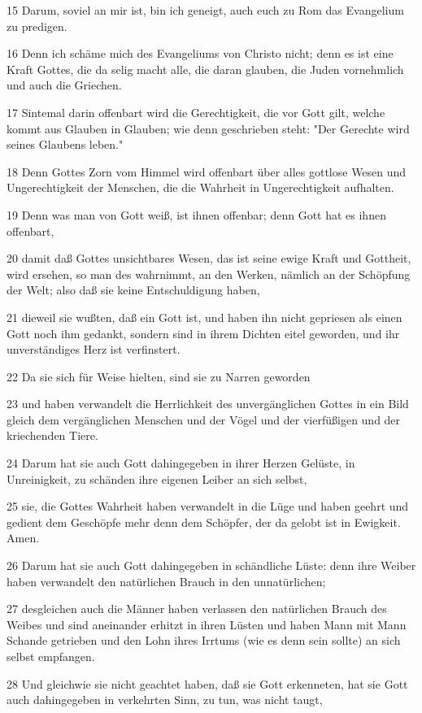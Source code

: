 \par 15 Darum, soviel an mir ist, bin ich geneigt, auch euch zu Rom das Evangelium zu predigen.
\par 16 Denn ich schäme mich des Evangeliums von Christo nicht; denn es ist eine Kraft Gottes, die da selig macht alle, die daran glauben, die Juden vornehmlich und auch die Griechen.
\par 17 Sintemal darin offenbart wird die Gerechtigkeit, die vor Gott gilt, welche kommt aus Glauben in Glauben; wie denn geschrieben steht: "Der Gerechte wird seines Glaubens leben."
\par 18 Denn Gottes Zorn vom Himmel wird offenbart über alles gottlose Wesen und Ungerechtigkeit der Menschen, die die Wahrheit in Ungerechtigkeit aufhalten.
\par 19 Denn was man von Gott weiß, ist ihnen offenbar; denn Gott hat es ihnen offenbart,
\par 20 damit daß Gottes unsichtbares Wesen, das ist seine ewige Kraft und Gottheit, wird ersehen, so man des wahrnimmt, an den Werken, nämlich an der Schöpfung der Welt; also daß sie keine Entschuldigung haben,
\par 21 dieweil sie wußten, daß ein Gott ist, und haben ihn nicht gepriesen als einen Gott noch ihm gedankt, sondern sind in ihrem Dichten eitel geworden, und ihr unverständiges Herz ist verfinstert.
\par 22 Da sie sich für Weise hielten, sind sie zu Narren geworden
\par 23 und haben verwandelt die Herrlichkeit des unvergänglichen Gottes in ein Bild gleich dem vergänglichen Menschen und der Vögel und der vierfüßigen und der kriechenden Tiere.
\par 24 Darum hat sie auch Gott dahingegeben in ihrer Herzen Gelüste, in Unreinigkeit, zu schänden ihre eigenen Leiber an sich selbst,
\par 25 sie, die Gottes Wahrheit haben verwandelt in die Lüge und haben geehrt und gedient dem Geschöpfe mehr denn dem Schöpfer, der da gelobt ist in Ewigkeit. Amen.
\par 26 Darum hat sie auch Gott dahingegeben in schändliche Lüste: denn ihre Weiber haben verwandelt den natürlichen Brauch in den unnatürlichen;
\par 27 desgleichen auch die Männer haben verlassen den natürlichen Brauch des Weibes und sind aneinander erhitzt in ihren Lüsten und haben Mann mit Mann Schande getrieben und den Lohn ihres Irrtums (wie es denn sein sollte) an sich selbst empfangen.
\par 28 Und gleichwie sie nicht geachtet haben, daß sie Gott erkenneten, hat sie Gott auch dahingegeben in verkehrten Sinn, zu tun, was nicht taugt,
